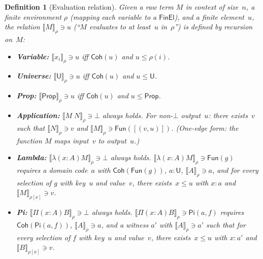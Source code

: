 \documentclass[11pt]{article}
\newcommand{\Pitype}[2]{\Pi(#1)#2}
\newcommand{\Lamterm}[2]{\lambda(#1)#2}
\newcommand{\App}[2]{#1\;#2}
\newcommand{\U}{\mathsf{U}}
\newcommand{\Prop}{\mathsf{Prop}}
\newcommand{\PropCode}{\mathsf{Prop}}
\newcommand{\FinEl}{\mathsf{FinEl}}
\newcommand{\Bot}{\bot}
\newcommand{\UCode}{\mathsf{U}}
\newcommand{\FunEl}[1]{\mathsf{Fun}(#1)}
\newcommand{\PiC}[2]{\mathsf{Pi}(#1,#2)}
\newcommand{\LeCode}{\leq}
\newcommand{\Coh}{\mathsf{Coh}}
\newcommand{\FinMem}{\mathrel{:}}
\newcommand{\EvalRel}[3]{\llbracket #1 \rrbracket_{#2} \ni #3}
\newtheorem{definition}[theorem]{Definition}
\begin{document}
\begin{definition}[Evaluation relation]
  Given a raw term $M$ in context of size~$n$, a finite environment
  $\rho$ (mapping each variable to a $\FinEl$), and a finite
  element~$u$, the relation $\EvalRel{M}{\rho}{u}$ (``$M$ evaluates
  to at least~$u$ in~$\rho$'') is defined by recursion on~$M$:

  \begin{itemize}
    \item \textbf{Variable:}\;
      $\EvalRel{x_i}{\rho}{u}$
      iff $\Coh(u)$ and $u \LeCode \rho(i)$.

    \item \textbf{Universe:}\;
      $\EvalRel{\U}{\rho}{u}$ iff $\Coh(u)$ and $u \LeCode \UCode$.

    \item \textbf{Prop:}\;
      $\EvalRel{\Prop}{\rho}{u}$ iff $\Coh(u)$ and $u \LeCode \PropCode$.

    \item \textbf{Application:}\;
      $\EvalRel{\App{M}{N}}{\rho}{\Bot}$ always holds.
      For non-$\Bot$ output~$u$: there exists~$v$ such that
      $\EvalRel{N}{\rho}{v}$ and
      $\EvalRel{M}{\rho}{\FunEl{[(v,u)]}}$.
      (One-edge form: the function $M$ maps input~$v$
      to output~$u$.)

    \item \textbf{Lambda:}\;
      $\EvalRel{\Lamterm{x{:}A}{M}}{\rho}{\Bot}$ always holds.
      $\EvalRel{\Lamterm{x{:}A}{M}}{\rho}{\FunEl{g}}$
      requires a domain code~$a$ with
      $\Coh(\FunEl{g})$, $a \FinMem \UCode$,
      $\EvalRel{A}{\rho}{a}$,
      and for every selection of $g$ with key~$u$ and value~$v$,
      there exists~$x \LeCode u$ with $x \FinMem a$ and
      $\EvalRel{M}{\rho[x]}{v}$.

    \item \textbf{Pi:}\;
      $\EvalRel{\Pitype{x{:}A}{B}}{\rho}{\Bot}$ always holds.
      $\EvalRel{\Pitype{x{:}A}{B}}{\rho}{\PiC{a}{f}}$
      requires $\Coh(\PiC{a}{f})$,
      $\EvalRel{A}{\rho}{a}$,
      and a witness $a'$ with $\EvalRel{A}{\rho}{a'}$ such that
      for every selection of $f$ with key~$u$ and value~$v$,
      there exists~$x \LeCode u$ with $x \FinMem a'$ and
      $\EvalRel{B}{\rho[x]}{v}$.
  \end{itemize}
\end{definition}
\end{document}

